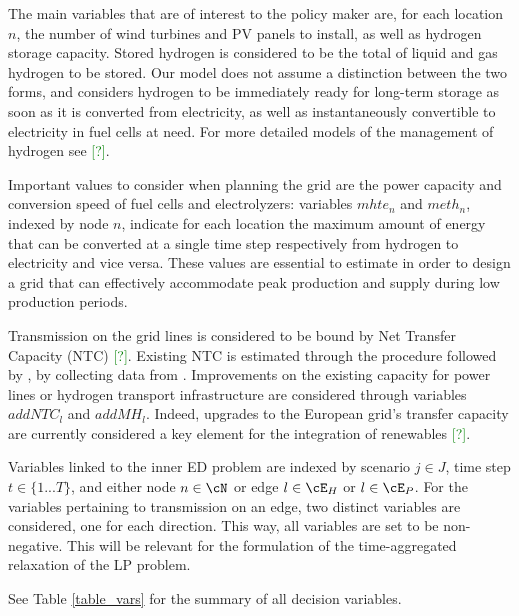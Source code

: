 The main variables that are of interest to the policy maker are, for each location $n$, the number of wind turbines and PV panels to install, as well as hydrogen storage capacity.
Stored hydrogen is considered to be the total of liquid and gas hydrogen to be stored. 
Our model does not assume a distinction between the two forms, and considers hydrogen to be immediately ready for long-term storage as soon as it is converted from electricity, as well as instantaneously convertible to electricity in fuel cells at need. 
For more detailed models of the management of hydrogen see \textcolor{green}{[?]}.

Important values to consider when planning the grid are the power capacity and conversion speed of fuel cells and electrolyzers: variables $mhte_n$ and $meth_n$, indexed by node $n$, indicate for each location the maximum amount of energy that can be converted at a single time step respectively from hydrogen to electricity and vice versa. 
These values are essential to estimate in order to design a grid that can effectively accommodate peak production and supply during low production periods.

Transmission on the grid lines is considered to be bound by Net Transfer Capacity (NTC) \textcolor{green}{[?]}. 
Existing NTC is estimated through the procedure followed by \textcolor{green}{\cite{tesi_NTC}}, by collecting data from \textcolor{green}{\cite{entsoe_NTC}}. 
Improvements on the existing capacity for power lines or hydrogen transport infrastructure are considered through variables $addNTC_l$ and $addMH_l$.
Indeed, upgrades to the European grid's transfer capacity are currently considered a key element for the integration of renewables \textcolor{green}{[?]}.

Variables linked to the inner ED problem are indexed by scenario \(j\in J\), time step \(t\in\{1...T\}\), and either node \(n \in \cN\) or edge $l\in\cE_H$ or $l \in \cE_P$. 
For the variables pertaining to transmission on an edge, two distinct variables are considered, one for each direction. 
This way, all variables are set to be non-negative. This will be relevant for the formulation of the time-aggregated relaxation of the LP problem.

See Table \ref{table_vars} for the summary of all decision variables.

